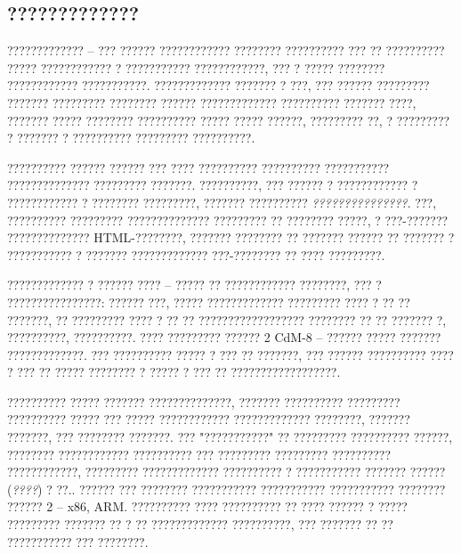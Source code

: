\subsection{?????????????}

????????????? -- ??? ?????? ???????????? ???????? ?????????? ??? ?? ?????????? ????? ???????????? ? ??????????? ????????????, ??? ? ????? ???????? ???????????? ???????????.   ????????????? ??????? ? ???, ??? ?????? ????????? ??????? ????????? ???????? ?????? ????????????? ?????????? ??????? ????, ??????? ????? ???????? ?????????? ????? ????? ??????, ????????? ??, ? ????????? ? ??????? ? ?????????? ????????? ??????????.  

?????????? ?????? ?????? ??? ???? ?????????? ?????????? ??????????? ?????????????? ????????? ???????.  ??????????, ??? ?????? ? ???????????? ? ???????????? ? ???????? ?????????, ??????? ?????????? \emph{???????????????}.  ???, ?????????? ????????? ?????????????? ????????? ?? ???????? ?????, ? ???-??????? ?????????????? HTML-????????, ??????? ???????? ?? ??????? ?????? ?? ??????? ? ??????????? ? ??????? ????????????? ???-???????? ?? ???? ?????????.  

????????????? ? ?????? ???? -- ????? ?? ???????????? ????????, ??? ? ????????????????: ?????? ???, ????? ????????????? ????????? ???? ? ?? ?? ???????, ?? ????????? ???? ? ?? ?? ?????????????????? ???????? ?? ?? ??????? ?, ??????????, ??????????.  ???? ????????? ?????? 2 CdM-8 -- ?????? ????? ??????? ?????????????.  ??? ?????????? ????? ? ??? ?? ???????, ??? ?????? ?????????? ???? ? ??? ?? ????? ???????? ? ????? ? ??? ?? ??????????????????.

?????????? ????? ??????? ??????????????, ??????? ?????????? ????????? ?????????? ????? ??? ????? ???????????? ????????????? ????????, ??????? ???????, ??? ???????? ???????.  ??? "???????????" ?? ????????? ?????????? ??????, ???????? ???????????? ?????????? ??? ????????? ????????? ?????????? ????????????, ????????? ????????????? ?????????? ? ??????????? ??????? ?????? (\emph{????}) ? ??..  ?????? ??? ???????? ??????????? ??????????? ??????????? ???????? ?????? 2 -- x86, ARM.  ?????????? ???? ?????????? ?? ???? ?????? ? ????? ????????? ??????? ?? ? ?? ????????????? ??????????, ??? ??????? ?? ?? ??????????? ??? ????????.
